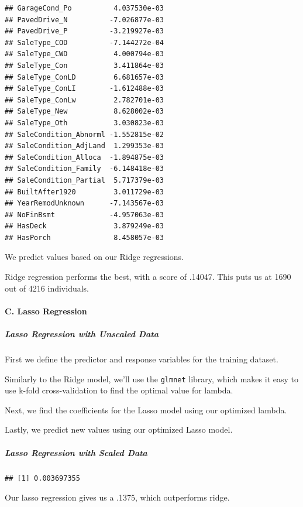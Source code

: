 \documentclass[
]{article}
\begin{document}
\begin{verbatim}
## GarageCond_Po          4.037530e-03
## PavedDrive_N          -7.026877e-03
## PavedDrive_P          -3.219927e-03
## SaleType_COD          -7.144272e-04
## SaleType_CWD           4.000794e-03
## SaleType_Con           3.411864e-03
## SaleType_ConLD         6.681657e-03
## SaleType_ConLI        -1.612488e-03
## SaleType_ConLw         2.782701e-03
## SaleType_New           8.628002e-03
## SaleType_Oth           3.030823e-03
## SaleCondition_Abnorml -1.552815e-02
## SaleCondition_AdjLand  1.299353e-03
## SaleCondition_Alloca  -1.894875e-03
## SaleCondition_Family  -6.148418e-03
## SaleCondition_Partial  5.717379e-03
## BuiltAfter1920         3.011729e-03
## YearRemodUnknown      -7.143567e-03
## NoFinBsmt             -4.957063e-03
## HasDeck                3.879249e-03
## HasPorch               8.458057e-03
\end{verbatim}

We predict values based on our Ridge regressions.

Ridge regression performs the best, with a score of .14047. This puts us
at 1690 out of 4216 individuals.

\hypertarget{c.-lasso-regression}{%
\paragraph{C. Lasso Regression}\label{c.-lasso-regression}}

\hypertarget{lasso-regression-with-unscaled-data}{%
\subparagraph{Lasso Regression with Unscaled
Data}\label{lasso-regression-with-unscaled-data}}

First we define the predictor and response variables for the training
dataset.

Similarly to the Ridge model, we'll use the \texttt{glmnet} library,
which makes it easy to use k-fold cross-validation to find the optimal
value for lambda.

Next, we find the coefficients for the Lasso model using our optimized
lambda.

Lastly, we predict new values using our optimized Lasso model.

\hypertarget{lasso-regression-with-scaled-data}{%
\subparagraph{Lasso Regression with Scaled
Data}\label{lasso-regression-with-scaled-data}}

\begin{verbatim}
## [1] 0.003697355
\end{verbatim}

Our lasso regression gives us a .1375, which outperforms ridge.
\end{document}
